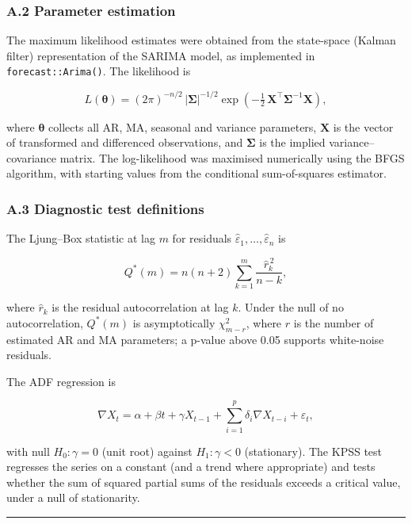 \documentclass[
  11pt,
]{article}
\begin{document}
\subsubsection{A.2 Parameter estimation}\label{a.2-parameter-estimation}

The maximum likelihood estimates were obtained from the state-space
(Kalman filter) representation of the SARIMA model, as implemented in
\texttt{forecast::Arima()}. The likelihood is

\[
L(\boldsymbol{\theta}) = (2\pi)^{-n/2}\,|\boldsymbol{\Sigma}|^{-1/2}\exp\!\left(-\tfrac{1}{2}\,\boldsymbol{X}^\top \boldsymbol{\Sigma}^{-1}\boldsymbol{X}\right),
\]

where \(\boldsymbol{\theta}\) collects all AR, MA, seasonal and variance
parameters, \(\boldsymbol{X}\) is the vector of transformed and
differenced observations, and \(\boldsymbol{\Sigma}\) is the implied
variance--covariance matrix. The log-likelihood was maximised
numerically using the BFGS algorithm, with starting values from the
conditional sum-of-squares estimator.

\subsubsection{A.3 Diagnostic test
definitions}\label{a.3-diagnostic-test-definitions}

The Ljung--Box statistic at lag \(m\) for residuals
\(\hat{\varepsilon}_1,\dots,\hat{\varepsilon}_n\) is

\[
Q^*(m) = n(n+2)\sum_{k=1}^{m}\frac{\hat{r}_k^{\,2}}{n-k},
\]

where \(\hat{r}_k\) is the residual autocorrelation at lag \(k\). Under
the null of no autocorrelation, \(Q^*(m)\) is asymptotically
\(\chi^2_{m-r}\), where \(r\) is the number of estimated AR and MA
parameters; a p-value above 0.05 supports white-noise residuals.

The ADF regression is

\[
\nabla X_t = \alpha + \beta t + \gamma X_{t-1} + \sum_{i=1}^{p}\delta_i \nabla X_{t-i} + \varepsilon_t,
\]

with null \(H_0:\gamma = 0\) (unit root) against \(H_1:\gamma < 0\)
(stationary). The KPSS test regresses the series on a constant (and a
trend where appropriate) and tests whether the sum of squared partial
sums of the residuals exceeds a critical value, under a null of
stationarity.

\begin{center}\rule{0.5\linewidth}{0.5pt}\end{center}
\end{document}
